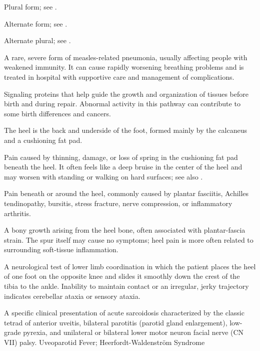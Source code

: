  Plural form; see .

 Alternate form; see .

 Alternate plural; see .

 A rare, severe form of measles-related pneumonia, usually affecting people with weakened immunity. It can cause rapidly worsening breathing problems and is treated in hospital with supportive care and management of complications.

 Signaling proteins that help guide the growth and organization of tissues before birth and during repair. Abnormal activity in this pathway can contribute to some birth differences and cancers.

 The heel is the back and underside of the foot, formed mainly by the calcaneus and a cushioning fat pad.

 Pain caused by thinning, damage, or loss of spring in the cushioning fat pad beneath the heel. It often feels like a deep bruise in the center of the heel and may worsen with standing or walking on hard surfaces; see also .

 Pain beneath or around the heel, commonly caused by plantar fasciitis, Achilles
tendinopathy, bursitis, stress fracture, nerve compression, or inflammatory arthritis.

 A bony growth arising from the heel bone, often associated with plantar-fascia strain. The spur itself
may cause no symptoms; heel pain is more often related to surrounding soft-tissue inflammation.

 A neurological test of lower limb coordination in which the patient places the heel of one foot on the opposite knee and slides it smoothly down the crest of the tibia to the ankle. Inability to maintain contact or an irregular, jerky trajectory indicates cerebellar ataxia or sensory ataxia.

 A specific clinical presentation of acute sarcoidosis characterized by the classic tetrad of anterior uveitis, bilateral parotitis (parotid gland enlargement), low-grade pyrexia, and unilateral or bilateral lower motor neuron facial nerve (CN VII) palsy.
\synonyms
Uveoparotid Fever; Heerfordt-Waldenström Syndrome

